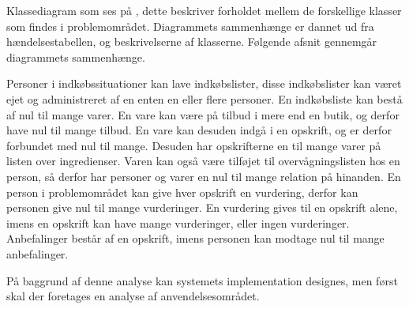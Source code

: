 Klassediagram som ses på , dette beskriver forholdet mellem de forskellige klasser som findes i problemområdet. 
Diagrammets sammenhænge er dannet ud fra hændelsestabellen, og beskrivelserne af klasserne. 
Følgende afsnit gennemgår diagrammets sammenhænge.

Personer i indkøbssituationer kan lave indkøbslister, disse indkøbslister kan været ejet og administreret af en enten en eller flere personer.
En indkøbsliste kan bestå af nul til mange varer.
En vare kan være på tilbud i mere end en butik, og derfor have nul til mange tilbud.
En vare kan desuden indgå i en opskrift, og er derfor forbundet med nul til mange.
Desuden har opskrifterne en til mange varer på listen over ingredienser.
Varen kan også være tilføjet til overvågningslisten hos en person, så derfor har personer og varer en nul til mange relation på hinanden.
En person i problemområdet kan give hver opskrift en vurdering, derfor kan personen give nul til mange vurderinger.
En vurdering gives til en opskrift alene, imens en opskrift kan have mange vurderinger, eller ingen vurderinger.
Anbefalinger består af en opskrift, imens personen kan modtage nul til mange anbefalinger.

På baggrund af denne analyse kan systemets implementation designes, men først skal der foretages en analyse af anvendelsesområdet.
